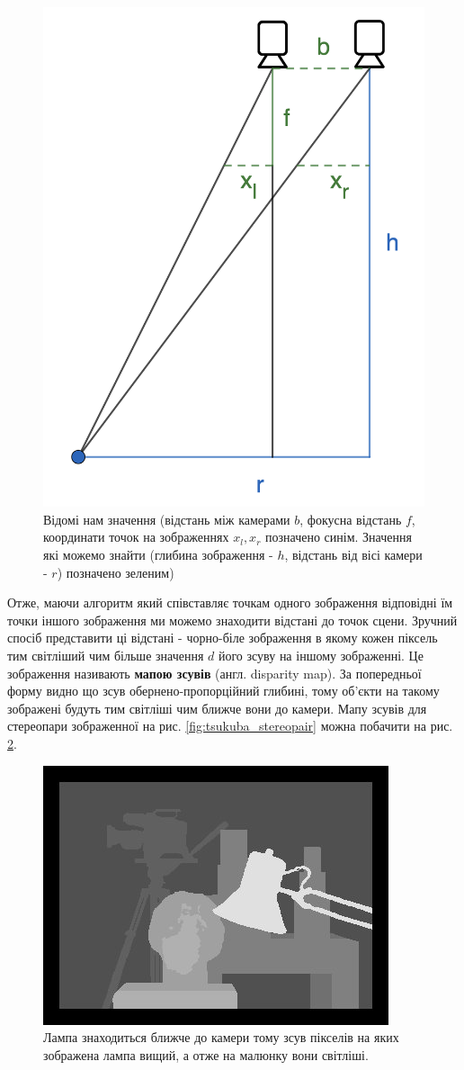\documentclass[11pt]{article}
\theoremstyle{definition}
\begin{document}
\begin{figure}[h]
	\includegraphics[width=0.7\linewidth]{triangulation_with_cameras}
	\centering
	\caption{Відомі нам значення (відстань між камерами $b$, фокусна відстань $f$, координати точок на зображеннях $x_l, x_r$ позначено синім. Значення які можемо знайти (глибина зображення - $h$, відстань від вісі камери - $r$) позначено зеленим)}
	\label{fig:tirangulation_showcase}
\end{figure}

Отже, маючи алгоритм який співставляє точкам одного зображення відповідні їм точки іншого зображення ми можемо знаходити відстані до точок сцени. Зручний спосіб представити ці відстані - чорно-біле зображення в якому кожен піксель тим світліший чим більше значення $d$ його зсуву на іншому зображенні. Це зображення називають \textbf{мапою зсувів} (англ. disparity map). За попередньої форму видно що зсув обернено-пропорційний глибині, тому об'єкти на такому зображені будуть тим світліші чим ближче вони до камери. Мапу зсувів для стереопари зображенної на рис. \ref{fig:tsukuba_stereopair} можна побачити на рис. \ref{fig:tsukuba_disparity}. 

\begin{figure}[h]
	\includegraphics[width=0.5\linewidth]{disparity_map_example}
	\centering
	\caption{Лампа знаходиться ближче до камери тому зсув пікселів на яких зображена лампа вищий, а отже на малюнку вони світліші.}
	\label{fig:tsukuba_disparity}
\end{figure}
\end{document}
